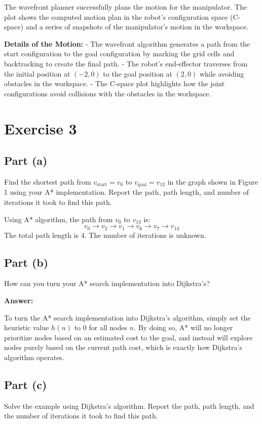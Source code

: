 \documentclass{article}
\begin{document}
The wavefront planner successfully plans the motion for the manipulator. The plot shows the computed motion plan in the robot’s configuration space (C-space) and a series of snapshots of the manipulator's motion in the workspace.

\textbf{Details of the Motion:}
- The wavefront algorithm generates a path from the start configuration to the goal configuration by marking the grid cells and backtracking to create the final path.
- The robot’s end-effector traverses from the initial position at \( (-2, 0) \) to the goal position at \( (2, 0) \) while avoiding obstacles in the workspace.
- The C-space plot highlights how the joint configurations avoid collisions with the obstacles in the workspace.

\section{Exercise 3}

\subsection{Part (a)}
Find the shortest path from $v_{\text{start}} = v_0$ to $v_{\text{goal}} = v_{13}$ in the graph shown in Figure 1 using your A* implementation. Report the path, path length, and number of iterations it took to find this path.

Using A* algorithm, the path from $v_0$ to $v_{13}$ is:
\[v_0 \to v_2 \to v_1 \to v_6 \to v_7 \to v_{13}\]
The total path length is $4$. The number of iterations is unknown.

\subsection{Part (b)}
How can you turn your A* search implementation into Dijkstra's?

\textbf{Answer:}

To turn the A* search implementation into Dijkstra's algorithm, simply set the heuristic value $h(n)$ to $0$ for all nodes $n$. By doing so, A* will no longer prioritize nodes based on an estimated cost to the goal, and instead will explore nodes purely based on the current path cost, which is exactly how Dijkstra's algorithm operates.


\subsection{Part (c)}
Solve the example using Dijkstra's algorithm. Report the path, path length, and the number of iterations it took to find this path.
\end{document}
